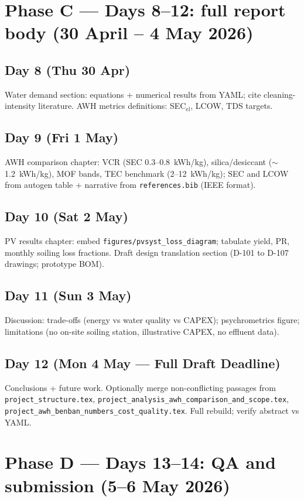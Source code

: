 \documentclass[11pt,a4paper]{article}
\begin{document}
\section{Phase C --- Days 8--12: full report body (30 April -- 4 May 2026)}
\subsection{Day 8 (Thu 30 Apr)}
Water demand section: equations + numerical results from YAML; cite cleaning-intensity literature. AWH metrics definitions: SEC$_{\mathrm{el}}$, LCOW, TDS targets.

\subsection{Day 9 (Fri 1 May)}
AWH comparison chapter: VCR (SEC 0.3--0.8~kWh/kg), silica/desiccant ($\sim$1.2~kWh/kg), MOF bands, TEC benchmark (2--12~kWh/kg); SEC and LCOW from autogen table + narrative from \texttt{references.bib} (IEEE format).

\subsection{Day 10 (Sat 2 May)}
PV results chapter: embed \texttt{figures/pvsyst\_loss\_diagram}; tabulate yield, PR, monthly soiling loss fractions. Draft design translation section (D-101 to D-107 drawings; prototype BOM).

\subsection{Day 11 (Sun 3 May)}
Discussion: trade-offs (energy vs water quality vs CAPEX); psychrometrics figure; limitations (no on-site soiling station, illustrative CAPEX, no effluent data).

\subsection{Day 12 (Mon 4 May --- Full Draft Deadline)}
Conclusions + future work. Optionally merge non-conflicting passages from \texttt{project\_structure.tex}, \texttt{project\_analysis\_awh\_comparison\_and\_scope.tex}, \texttt{project\_awh\_benban\_numbers\_cost\_quality.tex}. Full rebuild; verify abstract vs YAML.

\section{Phase D --- Days 13--14: QA and submission (5--6 May 2026)}
\end{document}
